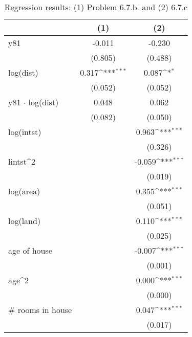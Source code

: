 \begin{table}[htbp]\centering
\def\sym#1{\ifmmode^{#1}\else\(^{#1}\)\fi}
\caption{Regression results: (1) Problem 6.7.b. and (2) 6.7.c}
\begin{tabular}{l*{2}{c}}
\toprule
                    &\multicolumn{1}{c}{(1)}         &\multicolumn{1}{c}{(2)}         \\
\midrule
y81                 &      -0.011         &      -0.230         \\
                    &     (0.805)         &     (0.488)         \\
\addlinespace
log(dist)           &       0.317\sym{***}&       0.087\sym{*}  \\
                    &     (0.052)         &     (0.052)         \\
\addlinespace
y81 $\cdot$ log(dist)     &       0.048         &       0.062         \\
                    &     (0.082)         &     (0.050)         \\
\addlinespace
log(intst)          &                     &       0.963\sym{***}\\
                    &                     &     (0.326)         \\
\addlinespace
lintst^2            &                     &      -0.059\sym{***}\\
                    &                     &     (0.019)         \\
\addlinespace
log(area)           &                     &       0.355\sym{***}\\
                    &                     &     (0.051)         \\
\addlinespace
log(land)           &                     &       0.110\sym{***}\\
                    &                     &     (0.025)         \\
\addlinespace
age of house        &                     &      -0.007\sym{***}\\
                    &                     &     (0.001)         \\
\addlinespace
age^2               &                     &       0.000\sym{***}\\
                    &                     &     (0.000)         \\
\addlinespace
# rooms in house    &                     &       0.047\sym{***}\\
                    &                     &     (0.017)         \\

\end{tabular}
\end{table}
